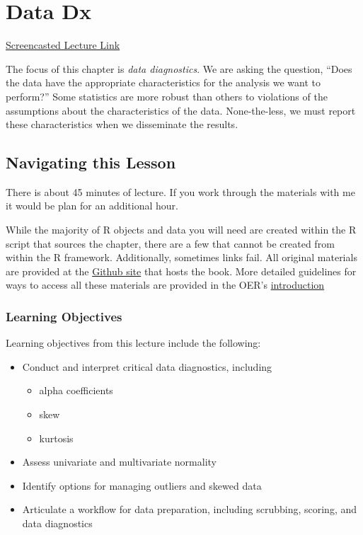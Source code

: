 \documentclass[
  11pt,
]{book}
\providecommand{\tightlist}{%
  \setlength{\itemsep}{0pt}\setlength{\parskip}{0pt}}
\begin{document}
\hypertarget{DataDx}{%
\chapter{Data Dx}\label{DataDx}}

\href{https://youtube.com/playlist?list=PLtz5cFLQl4KMSDPjNOLxzIclCsjVypm8n\&si=hIIFTxL2Zby2i8n0}{Screencasted Lecture Link}

The focus of this chapter is \emph{data diagnostics}. We are asking the question, ``Does the data have the appropriate characteristics for the analysis we want to perform?'' Some statistics are more robust than others to violations of the assumptions about the characteristics of the data. None-the-less, we must report these characteristics when we disseminate the results.

\hypertarget{navigating-this-lesson-2}{%
\section{Navigating this Lesson}\label{navigating-this-lesson-2}}

There is about 45 minutes of lecture. If you work through the materials with me it would be plan for an additional hour.

While the majority of R objects and data you will need are created within the R script that sources the chapter, there are a few that cannot be created from within the R framework. Additionally, sometimes links fail. All original materials are provided at the \href{https://github.com/lhbikos/ReC_MultivModel}{Github site} that hosts the book. More detailed guidelines for ways to access all these materials are provided in the OER's \protect\hyperlink{ReCintro}{introduction}

\hypertarget{learning-objectives-2}{%
\subsection{Learning Objectives}\label{learning-objectives-2}}

Learning objectives from this lecture include the following:

\begin{itemize}
\tightlist
\item
  Conduct and interpret critical data diagnostics, including

  \begin{itemize}
  \tightlist
  \item
    alpha coefficients
  \item
    skew
  \item
    kurtosis
  \end{itemize}
\item
  Assess univariate and multivariate normality
\item
  Identify options for managing outliers and skewed data
\item
  Articulate a workflow for data preparation, including scrubbing, scoring, and data diagnostics
\end{itemize}
\end{document}
